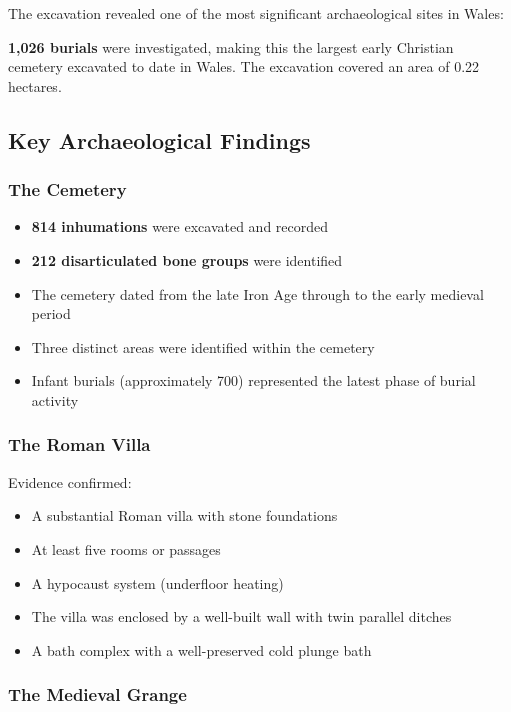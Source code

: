 \documentclass[11pt,a4paper]{article}
\begin{document}
The excavation revealed one of the most significant archaeological sites in Wales:

\begin{keyfact}
\textbf{1,026 burials} were investigated, making this the largest early Christian cemetery excavated to date in Wales. The excavation covered an area of 0.22 hectares.
\end{keyfact}

\subsection{Key Archaeological Findings}

\subsubsection{The Cemetery}

\begin{itemize}
    \item \textbf{814 inhumations} were excavated and recorded
    \item \textbf{212 disarticulated bone groups} were identified
    \item The cemetery dated from the late Iron Age through to the early medieval period
    \item Three distinct areas were identified within the cemetery
    \item Infant burials (approximately 700) represented the latest phase of burial activity
\end{itemize}

\subsubsection{The Roman Villa}

Evidence confirmed:
\begin{itemize}
    \item A substantial Roman villa with stone foundations
    \item At least five rooms or passages
    \item A hypocaust system (underfloor heating)
    \item The villa was enclosed by a well-built wall with twin parallel ditches
    \item A bath complex with a well-preserved cold plunge bath
\end{itemize}

\subsubsection{The Medieval Grange}
\end{document}
